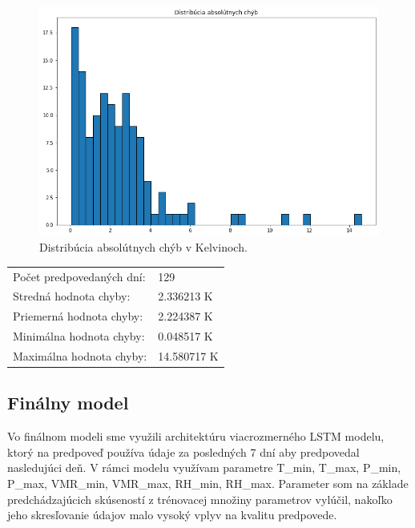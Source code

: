 \begin{figure}[!htbp]
  \centering
  \includegraphics[width=14cm]{img/dist_abs_chyby.png}
  \caption{Distribúcia absolútnych chýb v Kelvinoch.}
  \label{dest_abs_error}
\end{figure}

\begin{table}[]
\begin{tabular}{ll}
Počet predpovedaných dní: & 129       \\
Stredná hodnota chyby:    & 2.336213 K  \\
Priemerná hodnota chyby:  & 2.224387 K  \\
Minimálna hodnota chyby:  & 0.048517 K  \\
Maximálna hodnota chyby:  & 14.580717 K
\end{tabular}
\end{table}

\newpage
\subsection{Finálny model}
Vo finálnom modeli sme využili architektúru viacrozmerného LSTM modelu, ktorý na predpoveď používa údaje za posledných 7 dní aby predpovedal nasledujúci deň. V rámci modelu využívam parametre T_min, T_max, P_min, P_max, VMR_min, VMR_max, RH_min, RH_max. Parameter som na základe predchádzajúcich skúseností z trénovacej množiny parametrov vylúčil, nakoľko jeho skresľovanie údajov malo vysoký vplyv na kvalitu predpovede.


